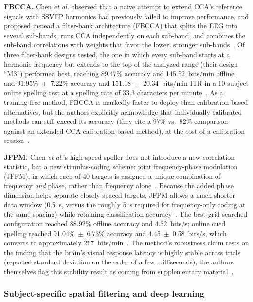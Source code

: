 \documentclass[11pt]{article}
\begin{document}
\textbf{FBCCA.} Chen \textit{et al.} observed that a naive attempt to extend CCA's reference signals with SSVEP harmonics had previously failed to improve performance, and proposed instead a filter-bank architecture (FBCCA) that splits the EEG into several sub-bands, runs CCA independently on each sub-band, and combines the sub-band correlations with weights that favor the lower, stronger sub-bands~\cite{chen2015fbcca}. Of three filter-bank designs tested, the one in which every sub-band starts at a harmonic frequency but extends to the top of the analyzed range (their design ``M3'') performed best, reaching 89.47\% accuracy and 145.52~bits/min offline, and 91.95\%~$\pm$~7.22\% accuracy and 151.18~$\pm$~20.34~bits/min ITR in a 10-subject online spelling test at a spelling rate of 33.3 characters per minute~\cite{chen2015fbcca}. As a training-free method, FBCCA is markedly faster to deploy than calibration-based alternatives, but the authors explicitly acknowledge that individually calibrated methods can still exceed its accuracy (they cite a 97\% vs.\ 92\% comparison against an extended-CCA calibration-based method), at the cost of a calibration session~\cite{chen2015fbcca}.

\textbf{JFPM.} Chen \textit{et al.}'s high-speed speller does not introduce a new correlation statistic, but a new stimulus-coding scheme: joint frequency-phase modulation (JFPM), in which each of 40 targets is assigned a unique combination of frequency \emph{and} phase, rather than frequency alone~\cite{chen2015pnas}. Because the added phase dimension helps separate closely spaced targets, JFPM allows a much shorter data window (0.5~s, versus the roughly 5~s required for frequency-only coding at the same spacing) while retaining classification accuracy~\cite{chen2015pnas}. The best grid-searched configuration reached 88.92\% offline accuracy and 4.32~bits/s; online cued spelling reached 91.04\%~$\pm$~6.73\% accuracy and 4.45~$\pm$~0.58~bits/s, which converts to approximately 267~bits/min~\cite{chen2015pnas}. The method's robustness claim rests on the finding that the brain's visual response latency is highly stable across trials (reported standard deviation on the order of a few milliseconds); the authors themselves flag this stability result as coming from supplementary material~\cite{chen2015pnas}.

\subsubsection{Subject-specific spatial filtering and deep learning}
\end{document}
